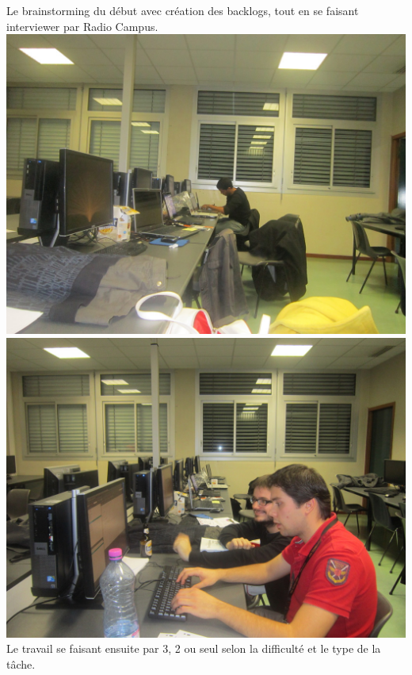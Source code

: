 \documentclass[a4paper,francais,titlepage]{article}
\begin{document}
   	Le brainstorming du début avec création des backlogs, tout en se faisant interviewer par Radio Campus. \\
   
  	\includegraphics[scale=0.38]{solo.jpeg} \hspace{0.3cm} \includegraphics[scale=0.38]{binome.jpeg} \\
    Le travail se faisant ensuite par 3, 2 ou seul selon la difficulté et le type de la tâche. \\
    
\end{document}
